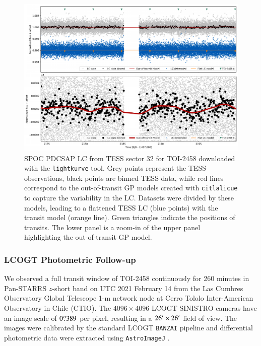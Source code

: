 \documentclass[traditabstract,longauth]{aa}
\begin{document}
\begin{figure}
\centering
\includegraphics[width=1.0\textwidth,height=0.7\textwidth]{figures/TOI-2458_LC_detrended.pdf}
\caption{SPOC PDCSAP LC from TESS sector 32 for TOI-2458 downloaded with the {\tt lightkurve} tool. Grey points represent the TESS observations, black points are binned TESS data, while red lines correspond to the out-of-transit GP models created with {\tt citlalicue} to capture the variability in the LC. Datasets were divided by these models, leading to a flattened TESS LC (blue points) with the transit model (orange line). Green triangles indicate the positions of transits. The lower panel is a zoom-in of the upper panel highlighting the out-of-transit GP model.}
\label{fig:tess_lc}
\end{figure}

\subsubsection{LCOGT Photometric Follow-up}

We observed a full transit window of TOI-2458 continuously for 260 minutes in Pan-STARRS $z$-short band on UTC 2021 February 14 from the Las Cumbres Observatory Global Telescope \citep[LCOGT;][]{Brown:2013} 1-m network node at Cerro Tololo Inter-American Observatory in Chile (CTIO). The $4096\times4096$ LCOGT SINISTRO cameras have an image scale of $0\overset{\prime\prime}{.}389$ per pixel, resulting in a $26^\prime\times26^\prime$ field of view. The images were calibrated by the standard LCOGT {\tt BANZAI} pipeline \citep{McCully:2018} and differential photometric data were extracted using {\tt AstroImageJ} \citep{Collins:2017}.
\end{document}
